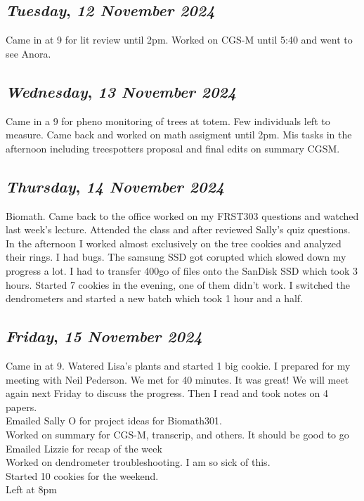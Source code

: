 \def\day{\textit{12 November 2024}}
\def\weekday{\textit{Tuesday}}
\subsection*{\weekday, \day}
Came in at 9 for lit review until 2pm. Worked on CGS-M until 5:40 and went to see Anora. 

\def\day{\textit{13 November 2024}}
\def\weekday{\textit{Wednesday}}
\subsection*{\weekday, \day}
Came in a 9 for pheno monitoring of trees at totem. Few individuals left to measure. Came back and worked on math assigment until 2pm. Mis tasks in the afternoon including treespotters proposal and final edits on summary CGSM.

\def\day{\textit{14 November 2024}}
\def\weekday{\textit{Thursday}}
\subsection*{\weekday, \day}
Biomath. Came back to the office worked on my FRST303 questions and watched last week's lecture. Attended the class and after reviewed Sally's quiz questions. In the afternoon I worked almost exclusively on the tree cookies and analyzed their rings. I had bugs. The samsung SSD got corupted which slowed down my progress a lot. I had to transfer 400go of files onto the SanDisk SSD which took 3 hours. Started 7 cookies in the evening, one of them didn't work. I switched the dendrometers and started a new batch which took 1 hour and a half. 

\def\day{\textit{15 November 2024}}
\def\weekday{\textit{Friday}}
\subsection*{\weekday, \day}
Came in at 9. Watered Lisa's plants and started 1 big cookie. I prepared for my meeting with Neil Pederson. We met for 40 minutes. It was great! We will meet again next Friday to discuss the progress. Then I read and took notes on 4 papers. \\
Emailed Sally O for project ideas for Biomath301. \\
Worked on summary for CGS-M, transcrip, and others. It should be good to go\\
Emailed Lizzie for recap of the week\\
Worked on dendrometer troubleshooting. I am so sick of this.\\
Started 10 cookies for the weekend.\\
Left at 8pm

